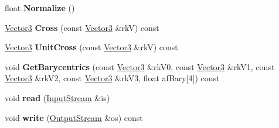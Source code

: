 \begin{DoxyCompactItemize}
\item 
float {\bfseries Normalize} ()\hypertarget{class_magnum_1_1_vector3_a53d092fe8f085b7681a8c6239d1da6a4}{}\label{class_magnum_1_1_vector3_a53d092fe8f085b7681a8c6239d1da6a4}

\item 
\hyperlink{class_magnum_1_1_vector3}{Vector3} {\bfseries Cross} (const \hyperlink{class_magnum_1_1_vector3}{Vector3} \&rkV) const \hypertarget{class_magnum_1_1_vector3_abbc6a5c99eaa8243783fd2104506e346}{}\label{class_magnum_1_1_vector3_abbc6a5c99eaa8243783fd2104506e346}

\item 
\hyperlink{class_magnum_1_1_vector3}{Vector3} {\bfseries Unit\+Cross} (const \hyperlink{class_magnum_1_1_vector3}{Vector3} \&rkV) const \hypertarget{class_magnum_1_1_vector3_a2f589e07fc31f8e732d22653b8c32c7c}{}\label{class_magnum_1_1_vector3_a2f589e07fc31f8e732d22653b8c32c7c}

\item 
void {\bfseries Get\+Barycentrics} (const \hyperlink{class_magnum_1_1_vector3}{Vector3} \&rk\+V0, const \hyperlink{class_magnum_1_1_vector3}{Vector3} \&rk\+V1, const \hyperlink{class_magnum_1_1_vector3}{Vector3} \&rk\+V2, const \hyperlink{class_magnum_1_1_vector3}{Vector3} \&rk\+V3, float af\+Bary\mbox{[}4\mbox{]}) const \hypertarget{class_magnum_1_1_vector3_a804f2a921907c56544ddf536efca03dd}{}\label{class_magnum_1_1_vector3_a804f2a921907c56544ddf536efca03dd}

\item 
void {\bfseries read} (\hyperlink{class_magnum_1_1_input_stream}{Input\+Stream} \&is)\hypertarget{class_magnum_1_1_vector3_a447f630909751dce240fae259238ce99}{}\label{class_magnum_1_1_vector3_a447f630909751dce240fae259238ce99}

\item 
void {\bfseries write} (\hyperlink{class_magnum_1_1_output_stream}{Output\+Stream} \&os) const \hypertarget{class_magnum_1_1_vector3_a147ffd1efd06ab4ab31ca3b1d6505bd0}{}\label{class_magnum_1_1_vector3_a147ffd1efd06ab4ab31ca3b1d6505bd0}

\end{DoxyCompactItemize}
